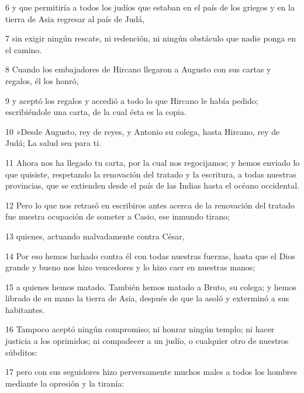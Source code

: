 \par 6 y que permitiría a todos los judíos que estaban en el país de los griegos y en la tierra de Asia regresar al país de Judá,

\par 7 sin exigir ningún rescate, ni redención, ni ningún obstáculo que nadie ponga en el camino.

\par 8 Cuando los embajadores de Hircano llegaron a Augusto con sus cartas y regalos, él los honró,

\par 9 y aceptó los regalos y accedió a todo lo que Hircano le había pedido; escribiéndole una carta, de la cual ésta es la copia.

\par 10 »Desde Augusto, rey de reyes, y Antonio su colega, hasta Hircano, rey de Judá; La salud sea para ti.

\par 11 Ahora nos ha llegado tu carta, por la cual nos regocijamos; y hemos enviado lo que quisiste, respetando la renovación del tratado y la escritura, a todas nuestras provincias, que se extienden desde el país de las Indias hasta el océano occidental.

\par 12 Pero lo que nos retrasó en escribiros antes acerca de la renovación del tratado fue nuestra ocupación de someter a Casio, ese inmundo tirano;

\par 13 quienes, actuando malvadamente contra César,

\par 14 Por eso hemos luchado contra él con todas nuestras fuerzas, hasta que el Dios grande y bueno nos hizo vencedores y lo hizo caer en nuestras manos;

\par 15 a quienes hemos matado. También hemos matado a Bruto, su colega; y hemos librado de su mano la tierra de Asia, después de que la asoló y exterminó a sus habitantes.

\par 16 Tampoco aceptó ningún compromiso; ni honrar ningún templo; ni hacer justicia a los oprimidos; ni compadecer a un judío, o cualquier otro de nuestros súbditos:

\par 17 pero con sus seguidores hizo perversamente muchos males a todos los hombres mediante la opresión y la tiranía:


